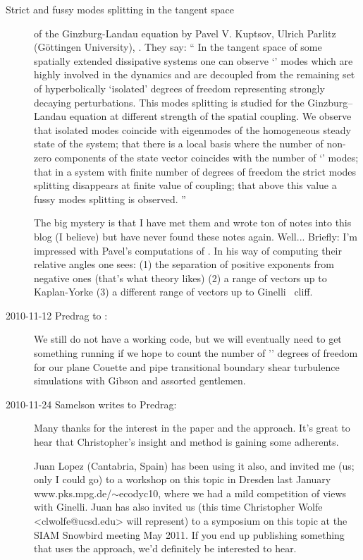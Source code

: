 \begin{description}
\item[Strict and fussy modes splitting in the tangent space]
of the Ginzburg-Landau equation
by Pavel V. Kuptsov, Ulrich Parlitz (G\"{o}ttingen University),
. They say:
``
In the tangent space of some spatially extended dissipative
systems one can observe `{\entangled}' modes which are highly
involved in the dynamics and are decoupled from the remaining set
of hyperbolically `isolated' degrees of freedom representing
strongly decaying perturbations. This modes splitting is studied
for the Ginzburg--Landau equation at different strength of the
spatial coupling. We observe that isolated modes coincide with
eigenmodes of the homogeneous steady state of the system; that
there is a local basis where the number of non-zero components of
the state vector coincides with the number of `{\entangled}' modes;
that in a system with finite number of degrees of freedom the
strict modes splitting disappears at finite value of coupling;
that above this value a fussy modes splitting is observed.
''

The big mystery is that I have met them and wrote ton of notes into
this blog (I believe) but have never found these notes again. Well...
Briefly: I'm impressed with Pavel's computations of {\cLvs}.
In his way of computing their relative angles one sees: (1) the separation
of positive exponents from negative ones (that's what {\po} theory likes)
(2) a range of vectors up to Kaplan-Yorke (3) a different range of vectors
up to Ginelli \etal\ cliff.

\item[2010-11-12 Predrag to
:]
We still do not have a working code, but we will eventually need to get
something running if we hope to count the number of '{\entangled}' degrees of
freedom for our plane Couette and pipe transitional boundary shear
turbulence simulations with Gibson and assorted gentlemen.

\item[2010-11-24 Samelson writes to Predrag:]
Many thanks for the interest in the paper and the
approach.  It's great to hear that Christopher's insight and method is
gaining some adherents.

Juan Lopez (Cantabria, Spain) has been using it also, and invited me (us;
only I could go) to a workshop on this topic in Dresden last January
{www.pks.mpg.de/$\sim$ecodyc10},
where we had a mild competition of views with Ginelli.   Juan has also
invited us (this time Christopher Wolfe <clwolfe@ucsd.edu> will
represent) to a symposium on this topic at the SIAM Snowbird meeting May
2011.  If you end up publishing something that uses the approach, we'd
definitely be interested to hear.


\end{description}
